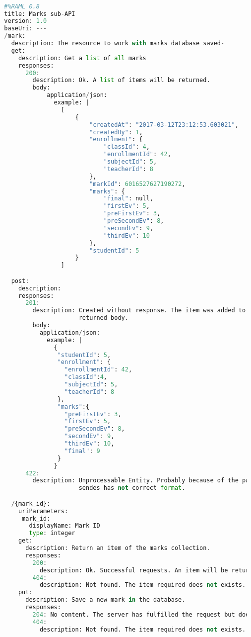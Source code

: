 \begin{lstlisting}[language=python,frame=none]

  #%RAML 0.8
  title: Marks sub-API
  version: 1.0
  baseUri: ---
  /mark:
    description: The resource to work with marks database saved-
    get:
      description: Get a list of all marks
      responses:
        200:
          description: Ok. A list of items will be returned.
          body:
              application/json:
                example: |
                  [
                      {
                          "createdAt": "2017-03-12T23:12:53.603021",
                          "createdBy": 1,
                          "enrollment": {
                              "classId": 4,
                              "enrollmentId": 42,
                              "subjectId": 5,
                              "teacherId": 8
                          },
                          "markId": 6016527627190272,
                          "marks": {
                              "final": null,
                              "firstEv": 5,
                              "preFirstEv": 3,
                              "preSecondEv": 8,
                              "secondEv": 9,
                              "thirdEv": 10
                          },
                          "studentId": 5
                      }
                  ]

    post:
      description:
      responses:
        201:
          description: Created without response. The item was added to database will not
                       returned body.
          body:
            application/json:
              example: |
                {
                 "studentId": 5,
                 "enrollment": {
                   "enrollmentId": 42,
                   "classId":4,
                   "subjectId": 5,
                   "teacherId": 8
                 },
                 "marks":{
                   "preFirstEv": 3,
                   "firstEv": 5,
                   "preSecondEv": 8,
                   "secondEv": 9,
                   "thirdEv": 10,
                   "final": 9
                 }
                }
        422:
          description: Unprocessable Entity. Probably because of the payload
                       sendes has not correct format.

    /{mark_id}:
      uriParameters:
       mark_id:
         displayName: Mark ID
         type: integer
      get:
        description: Return an item of the marks collection.
        responses:
          200:
            description: Ok. Successful requests. An item will be returned.
          404:
            description: Not found. The item required does not exists.
      put:
        description: Save a new mark in the database.
        responses:
          204: No content. The server has fulfilled the request but does not need to return an entity-body.
          404:
            description: Not found. The item required does not exists.


\end{lstlisting}
